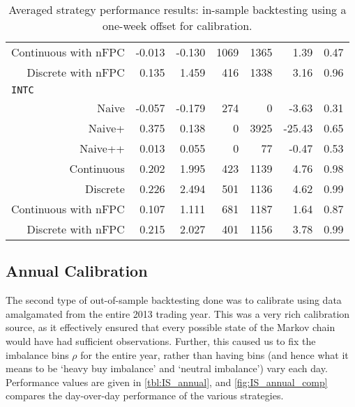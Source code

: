 \begin{table}
\begin{tabular}{@{} *{7}{r} @{}}
Continuous with nFPC & -0.013 & -0.130 & 1069 & 1365 & 1.39 & 0.47 \\
Discrete with nFPC & 0.135 & 1.459 & 416 & 1338 & 3.16 & 0.96 \\[2ex]
\multicolumn{7}{l}{\texttt{INTC}} \\ 
Naive & -0.057 & -0.179 & 274 & 0 & -3.63 & 0.31 \\
Naive+ & 0.375 & 0.138 & 0 & 3925 & -25.43 & 0.65 \\
Naive++ & 0.013 & 0.055 & 0 & 77 & -0.47 & 0.53 \\
Continuous & 0.202 & 1.995 & 423 & 1139 & 4.76 & 0.98 \\
Discrete & 0.226 & 2.494 & 501 & 1136 & 4.62 & 0.99 \\
Continuous with nFPC & 0.107 & 1.111 & 681 & 1187 & 1.64 & 0.87 \\
Discrete with nFPC & 0.215 & 2.027 & 401 & 1156 & 3.78 & 0.99 \\
\bottomrule
\end{tabular}
\caption[In-sample backtesting performance using week-offset calibration]{Averaged strategy performance results: in-sample backtesting using a one-week offset for calibration.}
\label{tbl:IS_week}
\end{table}

\FloatBarrier
\subsection{Annual Calibration}
The second type of out-of-sample backtesting done was to calibrate using data amalgamated from the entire 2013 trading year. This was a very rich calibration source, as it effectively ensured that every possible state of the Markov chain would have had sufficient observations. Further, this caused us to fix the imbalance bins $\rho$ for the entire year, rather than having bins (and hence what it means to be `heavy buy imbalance' and `neutral imbalance') vary each day. Performance values are given in \autoref{tbl:IS_annual}, and \autoref{fig:IS_annual_comp} compares the day-over-day performance of the various strategies. 

